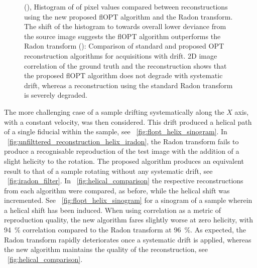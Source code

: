 \documentclass{osa-article}
\begin{document}
\begin{figure}
{  (), Histogram of of pixel values compared between reconstructions using the new proposed flOPT algorithm and the \gls{Radon transform}.
  The shift of the histogram to towards overall lower deviance from the source image suggests the flOPT algorithm outperforms the \gls{Radon transform}
  (): Comparison of standard and proposed \gls{OPT} reconstruction algorithms for acquisitions with drift.
  2D image correlation of the ground truth and the reconstruction shows that the proposed flOPT algorithm does not degrade with systematic drift, whereas a reconstruction using the standard \gls{Radon transform} is severely degraded.}
\end{figure}


The more challenging case of a sample drifting systematically along the \(X\) axis, with a constant velocity, was then considered. This drift produced a helical path of a single fiducial within the sample, see \figurename~\ref{fig:flopt_helix_sinogram}.
In \figurename~\ref{fig:unfilttered_reconstruction_helix_iradon}, the \gls{Radon transform} fails to produce a recognisable reproduction of the test image with the addition of a slight helicity to the rotation.
The proposed algorithm produces an equivalent result to that of a sample rotating without any systematic drift, see \figurename~\ref{fig:iradon_filter}.
In \figurename~\ref{fig:helical_comparison} the respective reconstructions from each algorithm were compared, as before, while the helical shift was incremented.
See \figurename~\ref{fig:flopt_helix_sinogram} for a sinogram of a sample wherein a helical shift has been induced.
When using correlation as a metric of reproduction quality, the new algorithm fares slightly worse at zero helicity, with \SI{94}{\percent} correlation compared to the \gls{Radon transform} at \SI{96}{\percent}.
As expected, the \gls{Radon transform} rapidly deteriorates once a systematic drift is applied, whereas the new algorithm maintains the quality of the reconstruction, see \figurename~\ref{fig:helical_comparison}.
\end{document}
